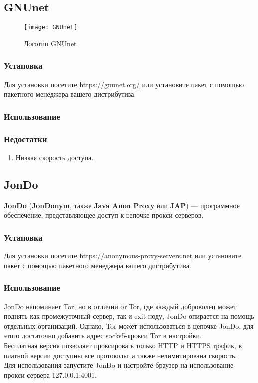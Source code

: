 \subsection{GNUnet}
\begin{wrapfigure}[9]{r}{0.25\linewidth}
\texttt{[image: GNUnet]}
\caption{Логотип GNUnet}
\end{wrapfigure}
\subsubsection{Установка}
Для установки посетите \url{https://gnunet.org/} или установите пакет с помощью пакетного менеджера вашего дистрибутива.
\subsubsection{Использование}
\subsubsection{Недостатки}
\begin{enumerate}
\item Низкая скорость доступа.
\end{enumerate}
\subsection{JonDo}
\textbf{JonDo} (\textbf{JonDonym}, также \textbf{Java Anon Proxy} или \textbf{JAP}) --- программное обеспечение, представляющее доступ к цепочке прокси-серверов.
\subsubsection{Установка}
Для установки посетите \url{https://anonymous-proxy-servers.net} или установите пакет с помощью пакетного менеджера вашего дистрибутива.
\subsubsection{Использование}
JonDo напоминает Tor, но в отличии от Tor, где каждый доброволец может поднять как промежуточный сервер, так и exit-ноду, JonDo опирается на помощь отдельных организаций. Однако, Tor может использоваться в цепочке JonDo, для этого достаточно добавить адрес socks5-прокси Tor в настройки.\\
Бесплатная версия позволяет проксировать только HTTP и HTTPS трафик, в платной версии доступны все протоколы, а также нелимитирована скорость.\\
Для использования запустите JonDo и настройте браузер на использование прокси-сервера 127.0.0.1:4001.

